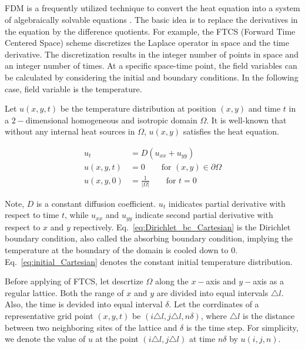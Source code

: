 \subsection{}

FDM is a frequently utilized technique to convert the heat equation
into a system of algebraically solvable equations
\cite{grossmann2007numerical}. The basic idea is to replace the
derivatives in the equation by the difference quotients. For example,
the FTCS (Forward Time Centered Space) scheme
\cite{pletcher2012computational} discretizes the Laplace operator in
space and the time derivative. The discretization results in the
integer number of points in space and an integer number of times. At a
specific space-time point, the field variables can be calculated by
considering the initial and boundary conditions. In the following
case, field variable is the temperature.


Let $u(x, y, t)$ be the temperature distribution at position $(x, y)$
and time $t$ in a $2-$dimensional homogeneous and isotropic domain
$\Omega$. It is well-known that without any internal heat sources in
$\Omega$, $u(x,y)$ satisfies the heat equation.

\begin{align}
  u_t &= D \left(u_{xx} + u_{yy}\right) \label{eq:Cartesian_heat_equation}\\
  u(x, y, t) &= 0 \qquad \text{for $(x, y) \in \partial \Omega$} \label{eq:Dirichlet_bc_Cartesian}\\
  u(x, y, 0) &= \frac{1}{|\Omega|} \qquad \text{for $t=0$} \label{eq:initial_Cartesian}
\end{align}

Note, $D$ is a constant diffusion coefficient. $u_t$ inidicates
partial derivative with respect to time $t$, while $u_{xx}$ and
$u_{yy}$ indicate second partial derivative with respect to $x$ and
$y$ repectively. Eq.~\ref{eq:Dirichlet_bc_Cartesian} is the Dirichlet
boundary condition, also called the absorbing boundary condition,
implying the temperature at the boundary of the domain is cooled down
to $0$. Eq.~\ref{eq:initial_Cartesian} denotes the constant initial
temperature distribution.

Before applying of FTCS, let descrtize $\Omega$ along the $x-$axis and
$y-$axis as a regular lattice. Both the range of $x$ and $y$ are
divided into equal intervals $\triangle l$. Also, the time is devided
into equal interval $\delta$. Let the corrdinates of a representative
grid point $(x, y, t)$ be $(i \triangle l, j \triangle l, n \delta)$,
where $\triangle l$ is the distance between two neighboring sites of
the lattice and $\delta$ is the time step. For simplicity, we denote
the value of $u$ at the point $(i \triangle l, j \triangle l)$ at time
$n \delta$ by $u(i, j, n)$.

